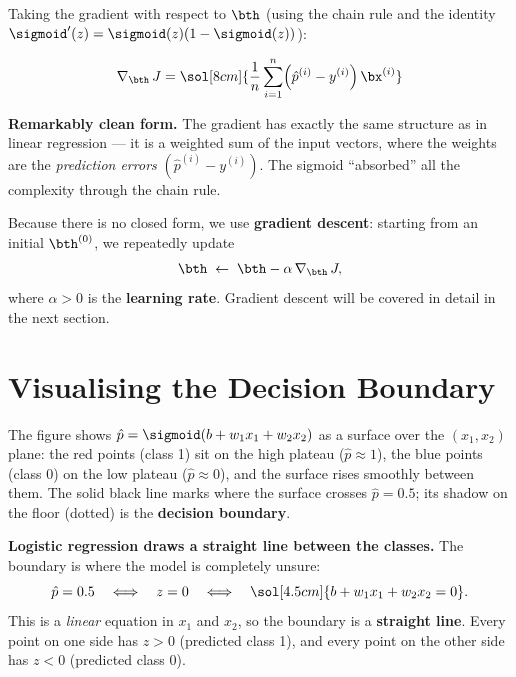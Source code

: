 \documentclass[12pt, a4paper]{article}
\begin{document}
Taking the gradient with respect to $\bth$ (using the chain rule and the
identity $\sigmoid'(z) = \sigmoid(z)(1-\sigmoid(z))$):

\begin{resultbox}
  \[
    \nabla_{\bth}\,J
    = \sol[8cm]{\frac{1}{n}\sum_{i=1}^{n}
      \Bigl(\hat{p}^{(i)} - y^{(i)}\Bigr)\,\bx^{(i)}}
  \]
\end{resultbox}

\begin{notebox}
  \textbf{Remarkably clean form.}
  The gradient has exactly the same structure as in linear regression —
  it is a weighted sum of the input vectors, where the weights are the
  \emph{prediction errors} $(\hat{p}^{(i)} - y^{(i)})$.
  The sigmoid ``absorbed'' all the complexity through the chain rule.
\end{notebox}

Because there is no closed form, we use \textbf{gradient descent}: starting
from an initial $\bth^{(0)}$, we repeatedly update
\[
  \bth \;\leftarrow\; \bth - \alpha\,\nabla_{\bth}\,J,
\]
where $\alpha > 0$ is the \textbf{learning rate}.
Gradient descent will be covered in detail in the next section.

\section{Visualising the Decision Boundary}


The figure shows $\hat{p} = \sigmoid(b + w_1x_1 + w_2x_2)$ as a surface over the
$(x_1, x_2)$ plane: the red points (class 1) sit on the high plateau
($\hat{p} \approx 1$), the blue points (class 0) on the low plateau
($\hat{p} \approx 0$), and the surface rises smoothly between them.
The solid black line marks where the surface crosses $\hat{p} = 0.5$;
its shadow on the floor (dotted) is the \textbf{decision boundary}.

\textbf{Logistic regression draws a straight line between the classes.}
The boundary is where the model is completely unsure:
\[
  \hat{p} = 0.5
  \quad\Longleftrightarrow\quad
  z = 0
  \quad\Longleftrightarrow\quad
  \sol[4.5cm]{b + w_1 x_1 + w_2 x_2 = 0}.
\]
This is a \emph{linear} equation in $x_1$ and $x_2$, so the boundary is a
\textbf{straight line}.
Every point on one side has $z > 0$ (predicted class 1), and every point on
the other side has $z < 0$ (predicted class 0).
\end{document}
